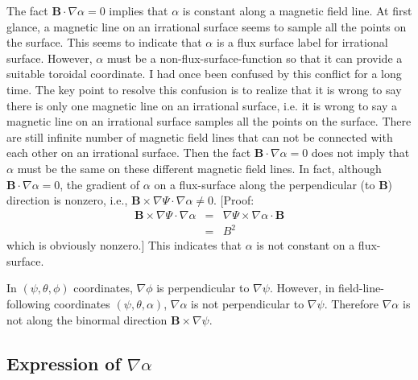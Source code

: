 \documentclass{llncs}
\begin{document}
The fact $\mathbf{B} \cdot \nabla \alpha = 0$ implies that $\alpha$ is
constant along a magnetic field line. At first glance, a magnetic line on an
irrational surface seems to sample all the points on the surface. This seems
to indicate that $\alpha$ is a flux surface label for irrational surface.
However, $\alpha$ must be a non-flux-surface-function so that it can provide a
suitable toroidal coordinate. I had once been confused by this conflict for a
long time. The key point to resolve this confusion is to realize that it is
wrong to say there is only one magnetic line on an irrational surface, i.e. it
is wrong to say a magnetic line on an irrational surface samples all the
points on the surface. There are still infinite number of magnetic field lines
that can not be connected with each other on an irrational surface. Then the
fact $\mathbf{B} \cdot \nabla \alpha = 0$ does not imply that $\alpha$ must be
the same on these different magnetic field lines. In fact, although
$\mathbf{B} \cdot \nabla \alpha = 0$, the gradient of $\alpha$ on a
flux-surface along the perpendicular (to $\mathbf{B}$) direction is nonzero,
i.e., $\mathbf{B} \times \nabla \Psi \cdot \nabla \alpha \neq 0$. [Proof:
\begin{eqnarray}
  \mathbf{B} \times \nabla \Psi \cdot \nabla \alpha & = & \nabla \Psi \times
  \nabla \alpha \cdot \mathbf{B} \nonumber\\
  & = & B^2 
\end{eqnarray}
which is obviously nonzero.] This indicates that $\alpha$ is not constant on a
flux-surface.

In $(\psi, \theta, \phi)$ coordinates, $\nabla \phi$ is perpendicular to
$\nabla \psi$. However, in field-line-following coordinates $(\psi, \theta,
\alpha)$, $\nabla \alpha$ is not perpendicular to $\nabla \psi$. Therefore
$\nabla \alpha$ is not along the binormal direction $\mathbf{B} \times \nabla
\psi$.

\subsection{Expression of $\nabla \alpha$}
\end{document}
